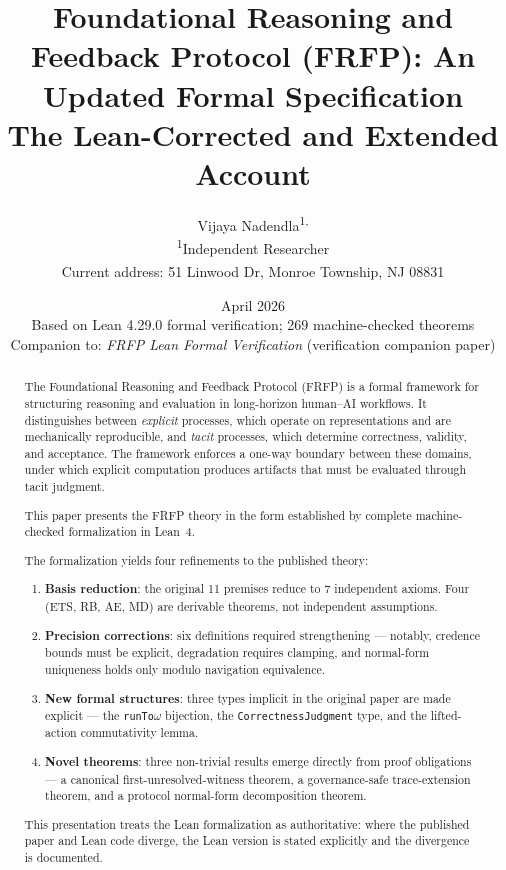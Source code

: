 \documentclass[12pt,a4paper]{article}
\title{%
  \textbf{Foundational Reasoning and Feedback Protocol (FRFP): An Updated Formal Specification}\\[0.5em]
  \large The Lean-Corrected and Extended Account
}
\author{%
  Vijaya Nadendla\textsuperscript{1,\dag}\\[0.3em]
  \small\textsuperscript{1}Independent Researcher\\
  \small\textsuperscript{\dag}Current address: 51 Linwood Dr, Monroe Township, NJ 08831
}
\date{April 2026\\[0.5em]
  \small Based on Lean 4.29.0 formal verification; 269 machine-checked theorems\\
  Companion to: \textit{FRFP Lean Formal Verification} (verification companion paper)
}
\theoremstyle{plain}
\theoremstyle{definition}
\theoremstyle{remark}
\begin{document}

\maketitle
\thispagestyle{empty}

\begin{abstract}
The Foundational Reasoning and Feedback Protocol (FRFP) is a formal framework for structuring
reasoning and evaluation in long-horizon human--AI workflows. It distinguishes between \emph{explicit}
processes, which operate on representations and are mechanically reproducible, and \emph{tacit} processes,
which determine correctness, validity, and acceptance. The framework enforces a one-way boundary
between these domains, under which explicit computation produces artifacts that must be evaluated
through tacit judgment.

This paper presents the FRFP theory in the form established
by complete machine-checked formalization in Lean~4.

The formalization yields four refinements to the published theory:
\begin{enumerate}
  \item \textbf{Basis reduction}: the original 11 premises reduce to 7 independent
        axioms. Four (ETS, RB, AE, MD) are derivable theorems, not independent
        assumptions.
  \item \textbf{Precision corrections}: six definitions required strengthening ---
        notably, credence bounds must be explicit, degradation requires clamping,
        and normal-form uniqueness holds only modulo navigation equivalence.
  \item \textbf{New formal structures}: three types implicit in the original paper
        are made explicit --- the \texttt{runTo$\omega$} bijection, the
        \texttt{CorrectnessJudgment} type, and the lifted-action commutativity lemma.
  \item \textbf{Novel theorems}: three non-trivial results emerge directly from
        proof obligations --- a canonical first-unresolved-witness theorem, a
        governance-safe trace-extension theorem, and a protocol normal-form
        decomposition theorem.
\end{enumerate}

This presentation treats the Lean formalization as authoritative: where the
published paper and Lean code diverge, the Lean version is stated explicitly and
the divergence is documented.
\end{abstract}
\end{document}
